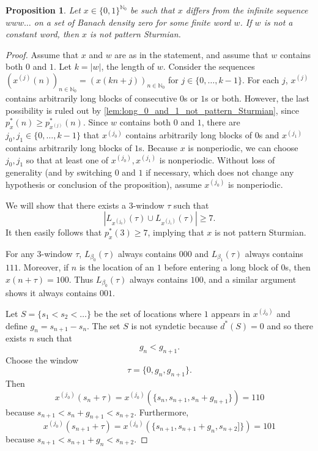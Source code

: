 \documentclass[11pt,reqno]{amsart}
\newtheorem{proposition}[theorem]{Proposition}
\theoremstyle{definition}
\theoremstyle{plain}
\newcommand{\N}{\mathbb{N}}
\begin{document}
\begin{proposition}\label{prop:w-constant}
Let $x \in \{0, 1\}^{\N_0}$ be such that $x$ differs from the infinite sequence $w w w \ldots$ on a set of Banach density zero for some finite word $w$. If $w$ is not a constant word, then $x$ is not pattern Sturmian. 
\end{proposition}
\begin{proof}
Assume that $x$ and $w$ are as in the statement, and assume that $w$ contains both $0$ and $1$. 
Let $k = |w|$, the length of $w$. Consider the sequences $(x^{(j)}(n))_{n \in \N_0} = (x(kn + j))_{n \in \N_0}$ for $j \in \{0, \ldots, k - 1\}$. For each $j$, $x^{(j)}$ contains arbitrarily long blocks of consecutive $0$s or $1$s or both. However, the last possibility is ruled out by \cref{lem:long_0_and_1_not_pattern_Sturmian}, since $p^*_x(n) \geq p^*_{x^{(j)}}(n)$. 
Since $w$ contains both $0$ and $1$, there are $j_0, j_1 \in \{0, \ldots, k-1\}$ that $x^{(j_0)}$ contains arbitrarily long blocks of $0$s and $x^{(j_1)}$ contains arbitrarily long blocks of $1$s. Because $x$ is nonperiodic, we can choose $j_0, j_1$ so that at least one of $x^{(j_0)}, x^{(j_1)}$ is nonperiodic. Without loss of generality (and by switching $0$ and $1$ if necessary, which does not change any hypothesis or conclusion of the proposition), assume $x^{(j_0)}$ is nonperiodic. 

We will show that there exists a $3$-window $\tau$ such that 
\[
    |L_{x^{(j_0)}}(\tau) \cup L_{x^{(j_1)}}(\tau)| \geq 7.
\]
It then easily follows that $p_{x}^*(3) \geq 7$, implying that $x$ is not pattern Sturmian.

For any $3$-window $\tau$, $L_{\beta_0}(\tau)$ always contains $000$ and $L_{\beta_1}(\tau)$ always contains $111$. Moreover, if $n$ is the location of an $1$ before entering a long block of $0$s, then $x(n + \tau) = 100$. Thus $L_{\beta_0}(\tau)$ always contains $100$, and a similar argument shows it always contains $001$.


Let $S = \{s_1 < s_2 < \ldots\}$ be the set of locations where $1$ appears in $x^{(j_0)}$ and define $g_n = s_{n+1} - s_n$. The set $S$ is not syndetic because $d^*(S) = 0$ and so there exists $n$ such that 
\begin{equation}\label{eq:condition_s_n}
    g_n < g_{n+1}.
\end{equation}
Choose the window
\begin{equation}\label{eq:choose_tau}
    \tau = \{0, g_n, g_{n+1}\}.
\end{equation}
Then 
\[
    x^{(j_0)}(s_n + \tau) = x^{(j_0)}(\{s_n, s_{n+1}, s_n + g_{n+1}\}) = 110
\]
because $s_{n+1} < s_n + g_{n+1} < s_{n+2}$. Furthermore,
\[
    x^{(j_0)}(s_{n+1} + \tau) = x^{(j_0)}(\{s_{n+1}, s_{n+1} + g_n, s_{n+2}]\}) = 101
\]
because $s_{n+1} < s_{n+1} + g_n < s_{n+2}$.


\end{proof}
\end{document}
